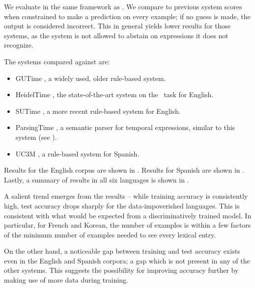 We evaluate in the same framework as \me.
We compare to 
	previous system scores when constrained to make a prediction on every
	example; if no guess is made, the output is considered incorrect.
This in general yields lower results for those systems,
  as the system is not allowed to
	abstain on expressions it does not recognize.

The systems compared against are:
\begin{itemize}
\item GUTime \cite{key:2010strotgen-temporal}, a widely used, older rule-based
              system.
\item HeidelTime \cite{key:2010strotgen-temporal}, the state-of-the-art
                 system on the \tempeval\ task for English.
\item SUTime \cite{key:2012chang-temporal}, a more recent rule-based
             system for English.
\item ParsingTime \mec, a semantic parser for temporal expressions, similar to
                  this system (see ).
\item UC3M \cite{2010vicente-uc3m}, a rule-based system for
             Spanish.
\end{itemize}

Results for the English corpus are shown in .
Results for Spanish are shown in .
Lastly, a summary of results in all six languages is shown in
  .

A salient trend emerges from the results -- while training accuracy is
  consistently high, test accuracy drops sharply for the data-impoverished
  languages.
This is consistent with what would be expected from a discriminatively trained
  model.
In particular, for French and Korean, the number of examples is within a
  few factors of the minimum number of examples needed to see every
  lexical entry.

On the other hand, a noticeable gap between training and test accuracy exists
  even in the English and Spanish corpora; a gap which is not present in any
  of the other systems.
This suggests the possibility for improving accuracy further by making use of
  more data during training.
